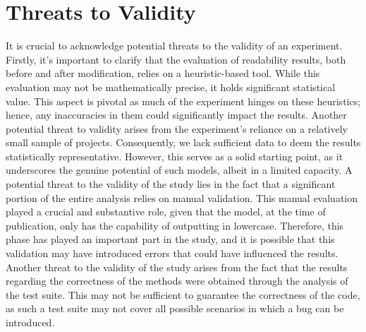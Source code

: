 \chapter{Threats to Validity}
\label{Chapter5}

It is crucial to acknowledge potential threats to the validity of an experiment. Firstly, it's important to clarify that the evaluation of readability results, both before and after modification, relies on a heuristic-based tool. While this evaluation may not be mathematically precise, it holds significant statistical value. This aspect is pivotal as much of the experiment hinges on these heuristics; hence, any inaccuracies in them could significantly impact the results. Another potential threat to validity arises from the experiment's reliance on a relatively small sample of projects. Consequently, we lack sufficient data to deem the results statistically representative. However, this serves as a solid starting point, as it underscores the genuine potential of such models, albeit in a limited capacity. \newline \newline A potential threat to the validity of the study lies in the fact that a significant portion of the entire analysis relies on manual validation. This manual evaluation played a crucial and substantive role, given that the model, at the time of publication, only has the capability of outputting in lowercase. Therefore, this phase has played an important part in the study, and it is possible that this validation may have introduced errors that could have influenced the results. \newline Another threat to the validity of the study arises from the fact that the results regarding the correctness of the methods were obtained through the analysis of the test suite. This may not be sufficient to guarantee the correctness of the code, as such a test suite may not cover all possible scenarios in which a bug can be introduced.
